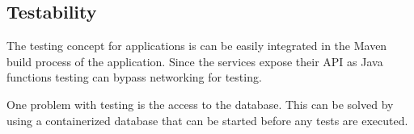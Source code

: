 \subsection{Testability}

The testing concept for \ms{} applications is can be easily integrated in the
Maven build process of the application. Since the services expose their API as
Java functions testing can bypass networking for testing. 

One problem with \ms{} testing is the access to the database. This can be solved
by using a containerized database that can be started before any tests are
executed. 
